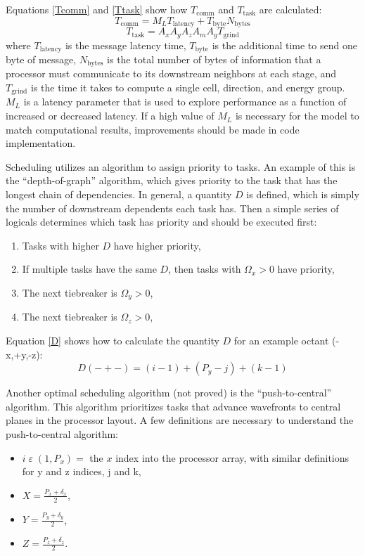 \documentclass[11pt, letterpaper,titlepage,oneside]{article}
\begin{document}
Equations \ref{Tcomm} and \ref{Ttask} show how $T_{\text{comm}}$ and $T_{\text{task}}$ are calculated:
\begin{equation}
T_{\text{comm}} = M_L T_{\text{latency}} + T_{\text{byte}} N_{\text{bytes}}
\label{Tcomm}
\end{equation}
\begin{equation}
T_{\text{task}} = A_x A_y A_z A_m A_g T_{\text{grind}}
\label{Ttask}
\end{equation}
where $T_{\text{latency}}$ is the message latency time, $T_{\text{byte}}$ is the additional time to send one byte of message, $N_{\text{bytes}}$ is the total number of bytes of information that a processor must communicate to its downstream neighbors at each stage, and $T_{\text{grind}}$ is the time it takes to compute a single cell, direction, and energy group. $M_L$ is a latency parameter that is used to explore performance as a function of increased or decreased latency. If a high value of $M_L$ is necessary for the model to match computational results, improvements should be made in code implementation.

Scheduling utilizes an algorithm to assign priority to tasks. An example of this is the ``depth-of-graph'' algorithm, which gives priority to the task that has the longest chain of dependencies. In general, a quantity $D$ is defined, which is simply the number of downstream dependents each task has. Then a simple series of logicals determines which task has priority and should be executed first:
\begin{enumerate}
\item Tasks with higher $D$ have higher priority,
\item If multiple tasks have the same $D$, then tasks with $\Omega_x > 0$ have priority,
\item The next tiebreaker is $\Omega_y > 0$,
\item The next tiebreaker is $\Omega_z > 0$,
\end{enumerate}

Equation \ref{D} shows how to calculate the quantity $D$ for an example octant (-x,+y,-z):
\begin{equation}
D(-+-) = (i-1) + (P_y-j) + (k-1)
\label{D}
\end{equation}

Another optimal scheduling algorithm (not proved) is the ``push-to-central'' algorithm. This algorithm prioritizes tasks that advance wavefronts to central planes in the processor layout. A few definitions are necessary to understand the push-to-central algorithm:
\begin{itemize}
\item $i \; \varepsilon \; (1,P_x) = $ the $x$ index into the processor array, with similar definitions for y and z indices, j and k,
\item $X = \frac{P_x + \delta_x}{2}$,
\item $Y = \frac{P_y + \delta_y}{2}$,
\item $Z = \frac{P_z + \delta_z}{2}$.
\end{itemize}
\end{document}
